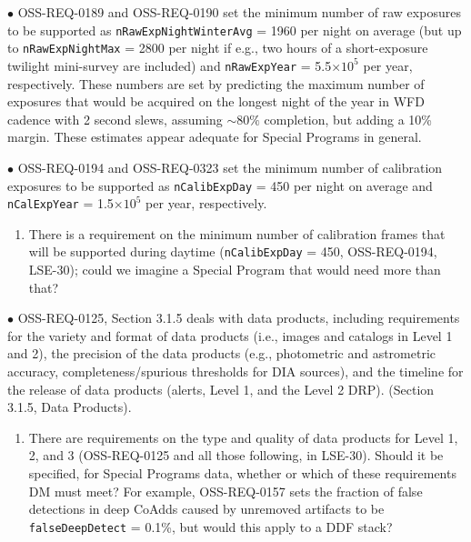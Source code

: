 \documentclass[DM,lsstdraft,toc]{lsstdoc}
\begin{document}
$\bullet$ OSS-REQ-0189 and OSS-REQ-0190 set the minimum number of raw exposures to be supported as {\tt nRawExpNightWinterAvg} = 1960 per night on average (but up to {\tt nRawExpNightMax} = 2800 per night if e.g., two hours of a short-exposure twilight mini-survey are included) and {\tt nRawExpYear} = 5.5$\times10^5$ per year, respectively. These numbers are set by predicting the maximum number of exposures that would be acquired on the longest night of the year in WFD cadence with 2 second slews, assuming $\sim80\%$ completion, but adding a 10\% margin. These estimates appear adequate for Special Programs in general.

$\bullet$ OSS-REQ-0194 and OSS-REQ-0323 set the minimum number of calibration exposures to be supported as {\tt nCalibExpDay} = 450 per night on average and {\tt nCalExpYear} = 1.5$\times10^5$ per year, respectively. 
\begin{enumerate}[topsep=-10pt,after=\vspace{10pt},label= \textbf{Concern \Roman*.},resume] \item \label{OSS-2} There is a requirement on the minimum number of calibration frames that will be supported during daytime ({\tt nCalibExpDay} = 450, OSS-REQ-0194, LSE-30); could we imagine a Special Program that would need more than that? \end{enumerate}

$\bullet$ OSS-REQ-0125, Section 3.1.5 deals with data products, including requirements for the variety and format of data products (i.e., images and catalogs in Level 1 and 2), the precision of the data products (e.g., photometric and astrometric accuracy, completeness/spurious thresholds for DIA sources), and the timeline for the release of data products (alerts, Level 1, and the Level 2 DRP).  (Section 3.1.5, Data Products).
\begin{enumerate}[topsep=-10pt,after=\vspace{10pt},label= \textbf{Concern \Roman*.},resume] \item \label{OSS-3} There are requirements on the type and quality of data products for Level 1, 2, and 3 (OSS-REQ-0125 and all those following, in LSE-30). Should it be specified, for Special Programs data, whether or which of these requirements DM must meet? For example, OSS-REQ-0157 sets the fraction of false detections in deep CoAdds caused by unremoved artifacts to be {\tt falseDeepDetect} = 0.1\%, but would this apply to a DDF stack? \end{enumerate}
\end{document}
